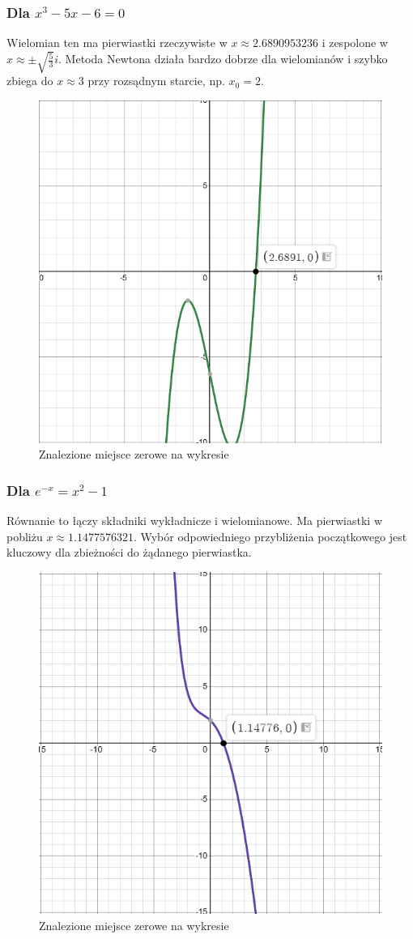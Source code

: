 \documentclass[a4paper,12pt]{article}
\begin{document}
    \subsubsection{Dla $x^3 - 5x - 6 = 0$}
    Wielomian ten ma pierwiastki rzeczywiste w $x \approx 2.6890953236 $ i zespolone w $x \approx \pm \sqrt{\frac{5}{3}}i$. Metoda Newtona działa bardzo dobrze dla wielomianów i szybko zbiega do $x \approx 3$ przy rozsądnym starcie, np. $x_0 = 2$.
    
    \begin{figure}[H]
        \centering
        \includegraphics[width=0.7\linewidth]{second_solution.PNG}
        \caption{Znalezione miejsce zerowe na wykresie}
        \label{fig:first-solutions}
    \end{figure}
    
    \subsubsection{Dla $e^{-x} = x^2 - 1$}
    Równanie to łączy składniki wykładnicze i wielomianowe. Ma pierwiastki w pobliżu $x \approx 1.1477576321$. Wybór odpowiedniego przybliżenia początkowego jest kluczowy dla zbieżności do żądanego pierwiastka.
    
    \begin{figure}[H]
        \centering
        \includegraphics[width=0.7\linewidth]{third_solution.PNG}
        \caption{Znalezione miejsce zerowe na wykresie}
        \label{fig:third-solution}
    \end{figure}
    
\end{document}
